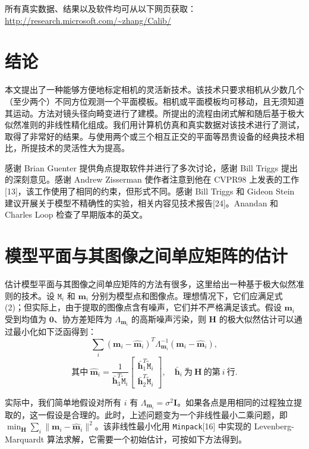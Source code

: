 \documentclass[a4paper,twocolumn,zihao=5,fontset=none,UTF8]{ctexart}
\newcommand{\Hm}{\mathbf{H}}
\newcommand{\h}{\mathbf{h}}
\newcommand{\m}{\mathbf{m}}
\newcommand{\M}{\mathtt{M}}
\newcommand{\tM}{\widetilde{\mathtt{M}}}
\begin{document}
所有真实数据、结果以及软件均可从以下网页获取：\url{http://research.microsoft.com/~zhang/Calib/}

\section{结论}

本文提出了一种能够方便地标定相机的灵活新技术。该技术只要求相机从少数几个（至少两个）不同方位观测一个平面模板。相机或平面模板均可移动，且无须知道其运动。方法对镜头径向畸变进行了建模。所提出的流程由闭式解和随后基于极大似然准则的非线性精化组成。我们用计算机仿真和真实数据对该技术进行了测试，取得了非常好的结果。与使用两个或三个相互正交的平面等昂贵设备的经典技术相比，所提技术的灵活性大为提高。

\vspace{0.5em}
\quad 感谢 Brian Guenter 提供角点提取软件并进行了多次讨论，感谢 Bill Triggs 提出的深刻意见。感谢 Andrew Zisserman 使作者注意到他在 CVPR98 上发表的工作[13]，该工作使用了相同的约束，但形式不同。感谢 Bill Triggs 和 Gideon Stein 建议开展关于模型不精确性的实验，相关内容见技术报告[24]。Anandan 和 Charles Loop 检查了早期版本的英文。

\appendix
{}

\section{模型平面与其图像之间单应矩阵的估计}

估计模型平面与其图像之间单应矩阵的方法有很多，这里给出一种基于极大似然准则的技术。设 $\M_i$ 和 $\m_i$ 分别为模型点和图像点。理想情况下，它们应满足式 (2)；但实际上，由于提取的图像点含有噪声，它们并不严格满足该式。假设 $\m_i$ 受到均值为 $\mathbf{0}$、协方差矩阵为 $\Lambda_{\m_i}$ 的高斯噪声污染，则 $\Hm$ 的极大似然估计可以通过最小化如下泛函得到：
\begin{equation*}
  \sum_i(\m_i-\hat{\m}_i)^T\Lambda_{\m_i}^{-1}(\m_i-\hat{\m}_i),
\end{equation*}
\begin{equation*}
  \text{其中}\ \hat{\m}_i=\frac{1}{\bar{\h}_3^T\tM_i}
  \begin{bmatrix}\bar{\h}_1^T\tM_i\\ \bar{\h}_2^T\tM_i\end{bmatrix},
  \quad \bar{\h}_i\ \text{为}\ \Hm\ \text{的第}\ i\ \text{行}.
\end{equation*}

实际中，我们简单地假设对所有 $i$ 有 $\Lambda_{\m_i}=\sigma^2\mathbf{I}$。如果各点是用相同的过程独立提取的，这一假设是合理的。此时，上述问题变为一个非线性最小二乘问题，即 $\min_{\Hm}\sum_i\|\m_i-\hat{\m}_i\|^2$。该非线性最小化用 \texttt{Minpack}[16] 中实现的 Levenberg-Marquardt 算法求解，它需要一个初始估计，可按如下方法得到。
\end{document}
